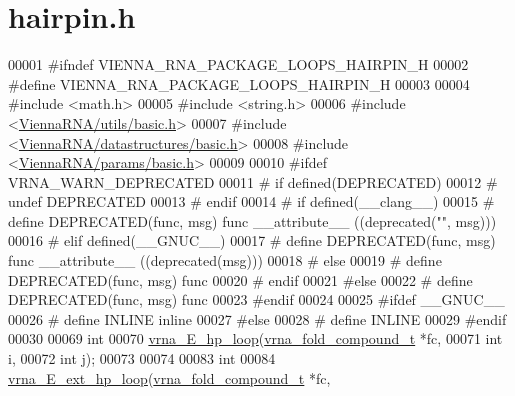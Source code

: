 \hypertarget{hairpin_8h_source}{}\section{hairpin.\+h}
\label{hairpin_8h_source}

\begin{DoxyCode}
00001 \textcolor{preprocessor}{#ifndef VIENNA\_RNA\_PACKAGE\_LOOPS\_HAIRPIN\_H}
00002 \textcolor{preprocessor}{#define VIENNA\_RNA\_PACKAGE\_LOOPS\_HAIRPIN\_H}
00003 
00004 \textcolor{preprocessor}{#include <math.h>}
00005 \textcolor{preprocessor}{#include <string.h>}
00006 \textcolor{preprocessor}{#include <\hyperlink{utils_2basic_8h}{ViennaRNA/utils/basic.h}>}
00007 \textcolor{preprocessor}{#include <\hyperlink{datastructures_2basic_8h}{ViennaRNA/datastructures/basic.h}>}
00008 \textcolor{preprocessor}{#include <\hyperlink{params_2basic_8h}{ViennaRNA/params/basic.h}>}
00009 
00010 \textcolor{preprocessor}{#ifdef VRNA\_WARN\_DEPRECATED}
00011 \textcolor{preprocessor}{# if defined(DEPRECATED)}
00012 \textcolor{preprocessor}{#   undef DEPRECATED}
00013 \textcolor{preprocessor}{# endif}
00014 \textcolor{preprocessor}{# if defined(\_\_clang\_\_)}
00015 \textcolor{preprocessor}{#  define DEPRECATED(func, msg) func \_\_attribute\_\_ ((deprecated("", msg)))}
00016 \textcolor{preprocessor}{# elif defined(\_\_GNUC\_\_)}
00017 \textcolor{preprocessor}{#  define DEPRECATED(func, msg) func \_\_attribute\_\_ ((deprecated(msg)))}
00018 \textcolor{preprocessor}{# else}
00019 \textcolor{preprocessor}{#  define DEPRECATED(func, msg) func}
00020 \textcolor{preprocessor}{# endif}
00021 \textcolor{preprocessor}{#else}
00022 \textcolor{preprocessor}{# define DEPRECATED(func, msg) func}
00023 \textcolor{preprocessor}{#endif}
00024 
00025 \textcolor{preprocessor}{#ifdef \_\_GNUC\_\_}
00026 \textcolor{preprocessor}{# define INLINE inline}
00027 \textcolor{preprocessor}{#else}
00028 \textcolor{preprocessor}{# define INLINE}
00029 \textcolor{preprocessor}{#endif}
00030 
00069 \textcolor{keywordtype}{int}
00070 \hyperlink{group__eval__loops__hp_ga57179ea326cc5ed8dfe4d3962b233128}{vrna\_E\_hp\_loop}(\hyperlink{group__fold__compound_structvrna__fc__s}{vrna\_fold\_compound\_t} *fc,
00071                \textcolor{keywordtype}{int}                  i,
00072                \textcolor{keywordtype}{int}                  j);
00073 
00074 
00083 \textcolor{keywordtype}{int}
00084 \hyperlink{group__eval__loops__hp_ga7d358fa17aaf1cfc312a053accd10778}{vrna\_E\_ext\_hp\_loop}(\hyperlink{group__fold__compound_structvrna__fc__s}{vrna\_fold\_compound\_t} *fc,

\end{DoxyCode}
